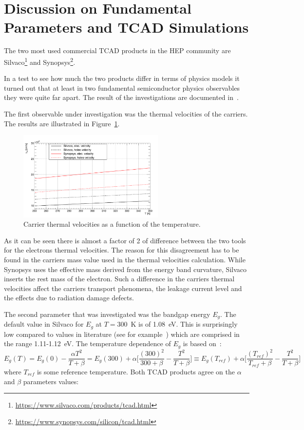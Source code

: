 \section{Discussion on Fundamental Parameters and TCAD Simulations}
\label{sec:TCADfund}
The two most used commercial TCAD products in the HEP community are Silvaco\footnote{\url{https://www.silvaco.com/products/tcad.html}} and Synopsys\footnote{\url{https://www.synopsys.com/silicon/tcad.html}}.

In a test to see how much the two products differ in terms of physics models it turned out 
that at least in two fundamental semiconductor physics observables they were quite far apart. 
The result of the investigations are documented in~\cite{bomben_rd50_Torino}.

The first observable under investigation was the thermal velocities of the carriers. The results 
are illustrated in Figure~\ref{fig:vtherm}.

\begin{figure}[!htbp]
\centering
\includegraphics[width=0.65\textwidth]{vtherm}
\caption{\label{fig:vtherm}Carrier thermal velocities as a function of the temperature.}
\end{figure}
As it can be seen there is almost a factor of 2 of difference between the two tools for the electrons 
thermal velocities. The reason for this disagreement has to be found in the carriers  mass value
used in the thermal velocities calculation. While Synopsys uses the effective  mass derived 
from the energy band curvature, Silvaco inserts the rest mass of the electron. 
Such a difference in the  carriers thermal velocities affect the carriers transport phenomena, 
the leakage current level and the effects due to radiation damage defects. 
 
 The second parameter that was investigated was the bandgap energy $E_g$. The default value in 
 Silvaco for $E_g$ at $T=$300~K is of 1.08~eV. This is surprisingly low compared to values in literature 
 (see for example~\cite{Lutz:411172,Sze1981,Wang1989,Shockley}) which are comprised 
 in the range 1.11-1.12~eV.
The temperature dependence of $E_g$ is based on~\cite{Sze1981}:
\begin{equation}
E_g(T)=E_g(0) -\dfrac{\alpha T^2}{T+\beta}=E_g(300)+\alpha\Bigg[ \dfrac{(300)^2}{300+\beta}-\dfrac{T^2}{T+\beta}  \Bigg] \equiv E_g(T_{ref})+\alpha\Bigg[ \dfrac{(T_{ref})^2}{T_{ref}+\beta}-\dfrac{T^2}{T+\beta}  \Bigg] 
\label{eq:EgT}
\end{equation}
where $T_{ref}$ is some reference temperature.
Both TCAD products agree on the $\alpha$ and $\beta$ parameters values:

